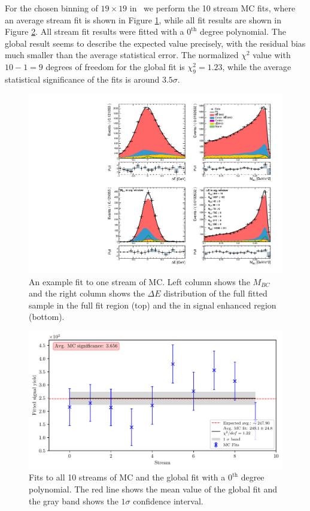For the chosen binning of $19 \times 19$ in \vars~we perform the 10 stream MC fits, where an average stream fit is shown in Figure \ref{fig:sig_streamfit}, while all fit results are shown in Figure \ref{fig:sig_global}. All stream fit results were fitted with a $0^{\mathrm{th}}$ degree polynomial. The global result seems to describe the expected value precisely, with the residual bias much smaller than the average statistical error. The normalized $\chi^2$ value with $10-1=9$ degrees of freedom for the global fit is $\chi^2_9 = 1.23$, while the average statistical significance of the fits is around $3.5 \sigma$.

\begin{figure}[H]
	\centering
	\captionsetup{width=0.8\linewidth}
	\includegraphics[width=\linewidth]{fig/sig_fit_mc}
	\caption{An example fit to one stream of MC. Left column shows the $M_{BC}$ and the right column shows the $\Delta E$ distribution of the full fitted sample in the full fit region (top) and the in signal enhanced region (bottom).}
	\label{fig:sig_streamfit}
\end{figure}

\begin{figure}[H]
	\centering
	\captionsetup{width=0.8\linewidth}
	\includegraphics[width=\linewidth]{fig/sig_global_mc}
	\caption{Fits to all 10 streams of MC and the global fit with a $0^{\mathrm{th}}$ degree polynomial. The red line shows the mean value of the global fit and the gray band shows the $1\sigma$ confidence interval.}
	\label{fig:sig_global}
\end{figure}

